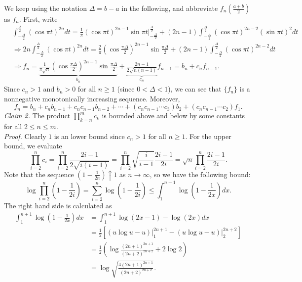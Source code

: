 \documentclass[12pt]{extarticle}
\begin{document}
\begin{enumerate}
We keep using the notation $\Delta=b-a$ in the following, and abbreviate $f_n\left(\frac{a+b}{2}\right)$ as $f_n$. First, write
\[
\begin{aligned}
&\int_{-\frac{\Delta}{2}}^\frac{\Delta}{2}(\cos \pi t)^{2n}dt = \frac{1}{\pi}(\cos \pi t)^{2n-1}\sin\pi t\Big|^\frac{\Delta}{2}_{-\frac{\Delta}{2}}+(2n-1)\int_{-\frac{\Delta}{2}}^\frac{\Delta}{2}(\cos \pi t)^{2n-2}(\sin\pi t)^2dt
\\&
\Rightarrow 2n\int_{-\frac{\Delta}{2}}^\frac{\Delta}{2}(\cos\pi t)^{2n}dt=
\frac{2}{\pi}\left(\cos\frac{\pi\Delta}{2}\right)^{2n-1}\sin\frac{\pi\Delta}{2}
+
(2n-1)\int_{-\frac{\Delta}{2}}^\frac{\Delta}{2}(\cos\pi t)^{2n-2}dt
\\&
\Rightarrow
f_n
=
\underbrace{\frac{1}{\pi\sqrt{n}}\left(\cos\frac{\pi\Delta}{2}\right)^{2n-1}\sin\frac{\pi\Delta}{2}}_{b_n}
+
\underbrace{\frac{2n-1}{2\sqrt{n(n-1)}}}_{c_n}f_{n-1}
=b_n+c_nf_{n-1}.
\end{aligned}
\]
Since $c_n>1$ and
$b_n>0$ for all $n\geq 1$ (since $0<\Delta<1$), we can see that $\{f_n\}$ is a nonnegative monotonically increasing sequence. Moreover,
\begin{equation}
f_n=b_n+c_nb_{n-1}+c_nc_{n-1}b_{n-2}+\cdots+(c_nc_{n-1}\cdots c_3)b_2+(c_nc_{n-1}\cdots c_2)f_1.
\label{9.13.11.2-1}
\end{equation}
\textit{Claim 2.} The product $\prod_{k=n}^mc_k$ is bounded above and below by some constants for all $2\leq n\leq m$.\\
\textit{Proof.} Clearly $1$ is an lower bound since $c_n>1$ for all $n\geq 1$. For the upper bound, we evaluate
\[
\prod_{i=2}^nc_i=\prod_{i=2}^n\frac{2i-1}{2\sqrt{i(i-1)}}=\prod_{i=2}^n\sqrt{\frac{i}{i-1}}\frac{2i-1}{2i}=\sqrt{n}\prod_{i=2}^n\frac{2i-1}{2i}.
\]
Note that the sequence $(1-\frac{1}{2n})\uparrow 1$ as $n\rightarrow\infty$, so we have the following bound:
\[
\log\prod_{i=2}^n\left(1-\frac{1}{2i}\right)
=
\sum_{i=2}^n\log\left(1-\frac{1}{2i}\right)
\leq\int_1^{n+1}\log\left(1-\frac{1}{2x}\right)dx.
\]
The right hand side is calculated as
\[
\begin{aligned}
\int_1^{n+1}\log\left(1-\frac{1}{2x}\right)dx
&=
\int_1^{n+1}\log(2x-1)-\log(2x)dx
\\&
=\frac{1}{2}\left[(u\log u-u)\Big|^{2n+1}_1-(u\log u-u)\Big|^{2n+2}_2\right]
\\&
=\frac{1}{2}\left(\log\frac{(2n+1)^{2n+1}}{(2n+2)^{2n+2}}+2\log 2\right)
\\&=
\log\sqrt{\frac{4(2n+1)^{2n+1}}{(2n+2)^{2n+2}}}.
\end{aligned}
\]
\end{enumerate}
\end{document}
